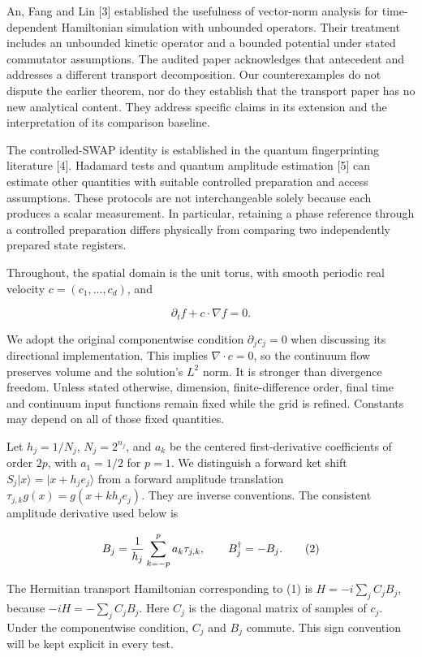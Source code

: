 An, Fang and Lin {[}3{]} established the usefulness of vector-norm
analysis for time-dependent Hamiltonian simulation with unbounded
operators. Their treatment includes an unbounded kinetic operator and a
bounded potential under stated commutator assumptions. The audited paper
acknowledges that antecedent and addresses a different transport
decomposition. Our counterexamples do not dispute the earlier theorem,
nor do they establish that the transport paper has no new analytical
content. They address specific claims in its extension and the
interpretation of its comparison baseline.

The controlled-SWAP identity is established in the quantum
fingerprinting literature {[}4{]}. Hadamard tests and quantum amplitude
estimation {[}5{]} can estimate other quantities with suitable
controlled preparation and access assumptions. These protocols are not
interchangeable solely because each produces a scalar measurement. In
particular, retaining a phase reference through a controlled preparation
differs physically from comparing two independently prepared state
registers.

Throughout, the spatial domain is the unit torus, with smooth periodic
real velocity \(c=(c_1,\ldots,c_d)\), and

\[
\partial_t f+c\cdot\nabla f=0. \tag{1}
\]

We adopt the original componentwise condition \(\partial_j c_j=0\) when
discussing its directional implementation. This implies
\(\nabla\cdot c=0\), so the continuum flow preserves volume and the
solution's \(L^2\) norm. It is stronger than divergence freedom. Unless
stated otherwise, dimension, finite-difference order, final time and
continuum input functions remain fixed while the grid is refined.
Constants may depend on all of those fixed quantities.

Let \(h_j=1/N_j\), \(N_j=2^{n_j}\), and \(a_k\) be the centered
first-derivative coefficients of order \(2p\), with \(a_1=1/2\) for
\(p=1\). We distinguish a forward ket shift
\(S_j|x\rangle=|x+h_j e_j\rangle\) from a forward amplitude translation
\(\tau_{j,k}g(x)=g(x+kh_j e_j)\). They are inverse conventions. The
consistent amplitude derivative used below is

\[
B_j={1\over h_j}\sum_{k=-p}^{p}a_k\tau_{j,k},\qquad B_j^\dagger=-B_j. \tag{2}
\]

The Hermitian transport Hamiltonian corresponding to (1) is
\(H=-i\sum_j C_jB_j\), because \(-iH=-\sum_j C_jB_j\). Here \(C_j\) is
the diagonal matrix of samples of \(c_j\). Under the componentwise
condition, \(C_j\) and \(B_j\) commute. This sign convention will be
kept explicit in every test.

